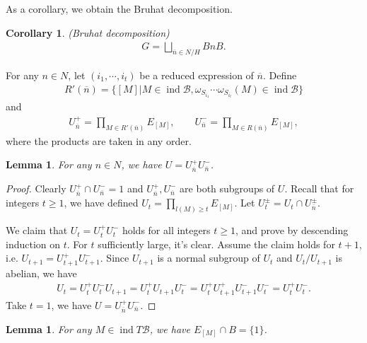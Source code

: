 \documentclass[12pt]{amsart}
\newtheorem{lemma}[theorem]{Lemma}
\newtheorem{corollary}[theorem]{Corollary}
\begin{document}
As a corollary, we obtain the Bruhat decomposition.

\begin{corollary}
    (Bruhat decomposition)
    \begin{align*}
         G = \bigsqcup\limits_{\overline{n}\in N/H} BnB .
    \end{align*}
   
\end{corollary}


For any $ n\in N$, let $(i_1,\cdots,i_t)$ be a reduced expression of $\overline{n}$. 
Define 
\begin{align*}
    R'(\overline{n}) = \{  [M] | M\in \operatorname{ind}\mathcal{B}, \omega_{S_{i_1}}\cdots \omega_{S_{i_t}}(M) \in \operatorname{ind}\mathcal{B}   \}
\end{align*}
and
\begin{align*}
    U_{\overline{n}}^+ = \prod\limits_{M\in  R'(\overline{n})} E_{[M]}, \qquad  U_{\overline{n}}^- = \prod\limits_{M\in  R(\overline{n})} E_{[M]},
\end{align*}
where the products are taken in any order.

\begin{lemma}
    For any $n\in N$, we have $U=U_{\overline{n}}^+ U_{\overline{n}}^- $.
\end{lemma}

\begin{proof}
    Clearly $U_{\overline{n}}^+ \cap U_{\overline{n}}^- = 1$ and $U_{\overline{n}}^+ ,U_{\overline{n}}^-$ are both subgroups of $U$.
    Recall that for integers $ t\geq 1$, we have defined $U_t = \prod\limits_{l(M)\geq t} E_{[M]}$. 
    Let $U_t^{\pm} = U_t \cap U_{\overline{n}}^{\pm}$.

    We claim that $U_t=U_t^+ U_t^-$ holds for all integers $t\geq 1$, and prove by descending induction on $t$.
    For $t$ sufficiently large, it's clear.
    Assume the claim holds for $t+1$, i.e. $U_{t+1} = U_{t+1}^+ U_{t+1}^-$.
    Since $U_{t+1}$ is a normal subgroup of $U_t$ and $U_t/U_{t+1}$ is abelian, we have
    \begin{align*}
        U_t = U_t^+ U_t^- U_{t+1} = U_t^+ U_{t+1}  U_t^- = U_t^+ U_{t+1}^+ U_{t+1}^- U_t^- = U_t^+ U_t^-.
    \end{align*}
    Take $t=1$, we have $U=U_{\overline{n}}^+ U_{\overline{n}}^- $.
\end{proof}

\begin{lemma}
    For any $M \in \operatorname{ind}T\mathcal{B}$, we have $E_{[M]}\cap B = \{1\}$.
\end{lemma}
\end{document}
